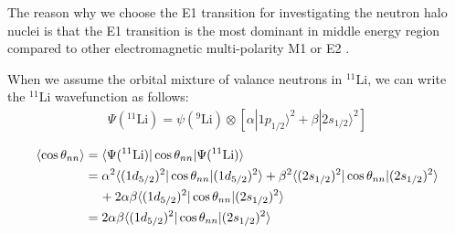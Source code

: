 The reason why we choose the E1 transition for investigating the neutron halo nuclei is that the E1 transition is the most dominant in middle energy region compared to other electromagnetic multi-polarity M1 or E2 \cite{Aumann}.


When we assume the orbital mixture of valance neutrons in $^{11}$Li, we can write the $^{11}$Li wavefunction as follows:
\begin{align}
    \Psi(^{11}\text{Li}) = \psi(^{9}\text{Li}) \otimes [\alpha |1p_{1/2} \rangle^2 + \beta |2s_{1/2} \rangle^2]
\end{align}

\begin{align}
    \langle \cos \theta_{nn} \rangle &= \langle \Psi({}^{11}\text{Li}) | \cos \theta_{nn} | \Psi({}^{11}\text{Li}) \rangle \notag \\
    &= \alpha^2 \langle (1d_{5/2})^2 | \cos \theta_{nn} | (1d_{5/2})^2 \rangle + \beta^2 \langle (2s_{1/2})^2 | \cos \theta_{nn} | (2s_{1/2})^2 \rangle \notag \\
    &\hspace{4mm} + 2\alpha \beta \langle (1d_{5/2})^2 | \cos \theta_{nn} | (2s_{1/2})^2 \rangle \notag \\
    &= 2\alpha \beta \langle (1d_{5/2})^2 | \cos \theta_{nn} | (2s_{1/2})^2 \rangle
\end{align}

